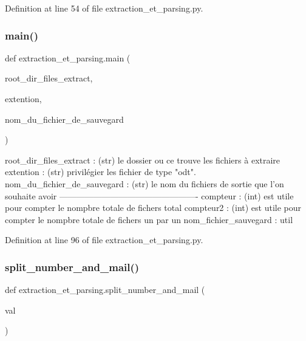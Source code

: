 Definition at line 54 of file extraction\+\_\+et\+\_\+parsing.\+py.

\mbox{\label{namespaceextraction__et__parsing_afa9eada7d7cd816ee7d84d53e1a9508e}} 
\subsubsection{\texorpdfstring{main()}{main()}}
{\footnotesize\ttfamily def extraction\+\_\+et\+\_\+parsing.\+main (\begin{DoxyParamCaption}\item[{}]{root\+\_\+dir\+\_\+files\+\_\+extract,  }\item[{}]{extention,  }\item[{}]{nom\+\_\+du\+\_\+fichier\+\_\+de\+\_\+sauvegard }\end{DoxyParamCaption})}

\begin{DoxyVerb}root_dir_files_extract : (str) le dossier ou ce trouve les fichiers à extraire
extention : (str) privilégier les fichier de type "odt".
nom_du_fichier_de_sauvegard : (str) le nom du fichiers de sortie que l'on souhaite avoir
-------------------------------------------------
compteur : (int) est utile pour compter le nompbre totale de fichers total
compteur2 : (int) est utile pour compter le nompbre totale de fichers un par un
nom_fichier_sauvegard : util
\end{DoxyVerb}
 

Definition at line 96 of file extraction\+\_\+et\+\_\+parsing.\+py.

\mbox{\label{namespaceextraction__et__parsing_a52f90c42ce48a5e54f7f19ae00555516}} 
\subsubsection{\texorpdfstring{split\+\_\+number\+\_\+and\+\_\+mail()}{split\_number\_and\_mail()}}
{\footnotesize\ttfamily def extraction\+\_\+et\+\_\+parsing.\+split\+\_\+number\+\_\+and\+\_\+mail (\begin{DoxyParamCaption}\item[{}]{val }\end{DoxyParamCaption})}



